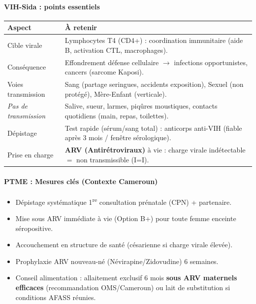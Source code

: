\documentclass[11pt]{article}
\begin{document}
\begin{bilan}
\paragraph{VIH-Sida : points essentiels}
\begin{center}
\begin{tabularx}{\linewidth}{|l|X|}\hline
\rowcolor{popblueL} \textbf{Aspect} & \textbf{À retenir} \\ \hline
Cible virale & Lymphocytes T4 (CD4+) : coordination immunitaire (aide B, activation CTL, macrophages). \\ \hline
Conséquence & Effondrement défense cellulaire $\rightarrow$ infections opportunistes, cancers (sarcome Kaposi). \\ \hline
Voies transmission & Sang (partage seringues, accidents exposition), Sexuel (non protégé), Mère-Enfant (verticale). \\ \hline
\emph{Pas de transmission} & Salive, sueur, larmes, piqûres moustiques, contacts quotidiens (main, repas, toilettes). \\ \hline
Dépistage & Test rapide (sérum/sang total) : anticorps anti-VIH (fiable après 3 mois / fenêtre sérologique). \\ \hline
Prise en charge & \textbf{ARV (Antirétroviraux)} à vie : charge virale indétectable $=$ non transmissible (I=I). \\ \hline
\end{tabularx}
\end{center}

\paragraph{PTME : Mesures clés (Contexte Cameroun)}
\begin{itemize}
    \item Dépistage systématique 1\textsuperscript{re} consultation prénatale (CPN) + partenaire.
    \item Mise sous ARV immédiate à vie (Option B+) pour toute femme enceinte séropositive.
    \item Accouchement en structure de santé (césarienne si charge virale élevée).
    \item Prophylaxie ARV nouveau-né (Névirapine/Zidovudine) 6 semaines.
    \item Conseil alimentation : allaitement exclusif 6 mois \textbf{sous ARV maternels efficaces} (recommandation OMS/Cameroun) ou lait de substitution si conditions AFASS réunies.
\end{itemize}


\end{bilan}
\end{document}
